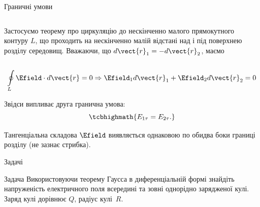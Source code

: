 \documentclass{beamer}
\begin{document}
\begin{frame}{Граничні умови}{}
\begin{onlyenv}
\begin{columns}
\begin{column}{0.6\linewidth}
				\begin{block}{}\small\justifying
					Застосуємо теорему про циркуляцію до нескінченно малого прямокутного
					контуру $L$, що проходить на нескінченно малій відстані над і під поверхнею
					розділу середовищ. Вважаючи, що $d\vect{r}_1 = -d\vect{r}_2$, маємо
				\end{block}
			\end{column}
			\begin{column}{0.4\linewidth}\centering
				
			\end{column}
		\end{columns}
		\begin{block}{}\small
			\begin{equation*}
				\oint\limits_L \Efield\cdot d\vect{r} = 0 \Rightarrow \Efield_1 d\vect{r}_1 +
				\Efield_2 d\vect{r}_2 = 0
			\end{equation*}
		\end{block}
		\begin{block}{}
			Звідси випливає друга гранична умова:
			\begin{equation*}
				\tcbhighmath{
					E_{1\tau} = E_{2\tau}.
				}
			\end{equation*}
		\end{block}
		\begin{alertblock}{}\justifying\small
			Тангенціальна складова $\Efield$ виявляється однаковою по обидва боки границі розділу (не
			зазнає стрибка).
		\end{alertblock}
	\end{onlyenv}
\end{frame}



\begin{frame}{Задачі}{}
	\begin{exampleblock}{Задача}\justifying
		Використовуючи теорему Гаусса в диференціальній формі знайдіть напруженість
		електричного поля всередині та зовні однорідно зарядженої кулі. Заряд кулі дорівнює
		$Q$, радіус кулі~$R$.
	\end{exampleblock}
\end{frame}
\end{document}
